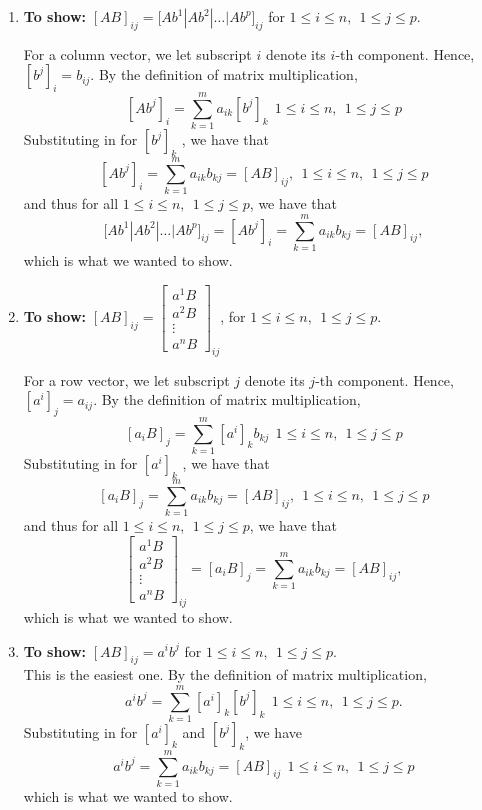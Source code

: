 \documentclass[letterpaper]{article}
\begin{document}
\begin{enumerate}
\setlength{\itemsep}{.1in}
\renewcommand{\labelenumi}{(\alph{enumi})}
\item  \textbf{To show:} $[AB]_{ij} = \big[ A b^1|Ab^2| \ldots | Ab^p \big]_{ij}$ for $1\le i\le n,~~1 \le j \le p$.

For a column vector, we let subscript $i$ denote its $i$-th component. Hence, $[b^j]_{i} = b_{ij}$. By the definition of matrix multiplication,
    $$[Ab^j]_{i}= \sum \limits_{k=1}^{m} a_{ik} [b^j]_k~~1\le i\le n,~~1 \le j \le p$$
    Substituting in for $[b^j]_k$ , we have that
    $$ [Ab^j]_{i} =   \sum \limits_{k=1}^{m} a_{ik} b_{kj} = [AB]_{ij},~~1\le i\le n,~~1 \le j \le p$$
    and thus for all $1\le i\le n,~~1 \le j \le p$, we have that
    $$\big[ A b^1|Ab^2| \ldots | Ab^p \big]_{ij}= [Ab^j]_{i} =   \sum \limits_{k=1}^{m} a_{ik} b_{kj} = [AB]_{ij},$$
    which is what we wanted to show.


\item  \textbf{To show:}  $[AB]_{ij}=\begin{bmatrix}  a^1 B \\ a^2 B \\ \vdots \\ a^n B \end{bmatrix}_{ij}$, for $1\le i\le n,~~1 \le j \le p$.

For a row vector, we let subscript $j$ denote its $j$-th component. Hence, $[a^i]_{j} = a_{ij}$. By the definition of  matrix multiplication,
    $$[a_{i}B]_{j}= \sum \limits_{k=1}^{m} [a^{i}]_k b_{kj} ~~1\le i\le n,~~1 \le j \le p$$
    Substituting in for $[a^i]_k$ , we have that
    $$ [a_{i}B]_{j} =   \sum \limits_{k=1}^{m} a_{ik} b_{kj} = [AB]_{ij},~~1\le i\le n,~~1 \le j \le p$$
    and thus for all $1\le i\le n,~~1 \le j \le p$, we have that
    $$\begin{bmatrix}  a^1 B \\ a^2 B \\ \vdots \\ a^n B \end{bmatrix}_{ij}=  [a_{i}B]_{j}= \sum \limits_{k=1}^{m} a_{ik} b_{kj} = [AB]_{ij},$$
    which is what we wanted to show.

\item  \textbf{To show:}   $[AB]_{ij} = a^i b^j$ for $1\le i\le n,~~1 \le j \le p$. \\

This is the easiest one. By the definition of matrix multiplication,
$$a^ib^j= \sum \limits_{k=1}^{m} [a^{i}]_k [b^{j}]_k ~~1\le i\le n,~~1 \le j \le p.$$
Substituting in for $[a^i]_k$ and $[b^j]_{k}$, we have
$$a^ib^j= \sum \limits_{k=1}^{m} a_{ik} b_{kj} = [AB]_{ij} ~~1\le i\le n,~~1 \le j \le p$$
which is what we wanted to show.

\end{enumerate}
\end{document}
